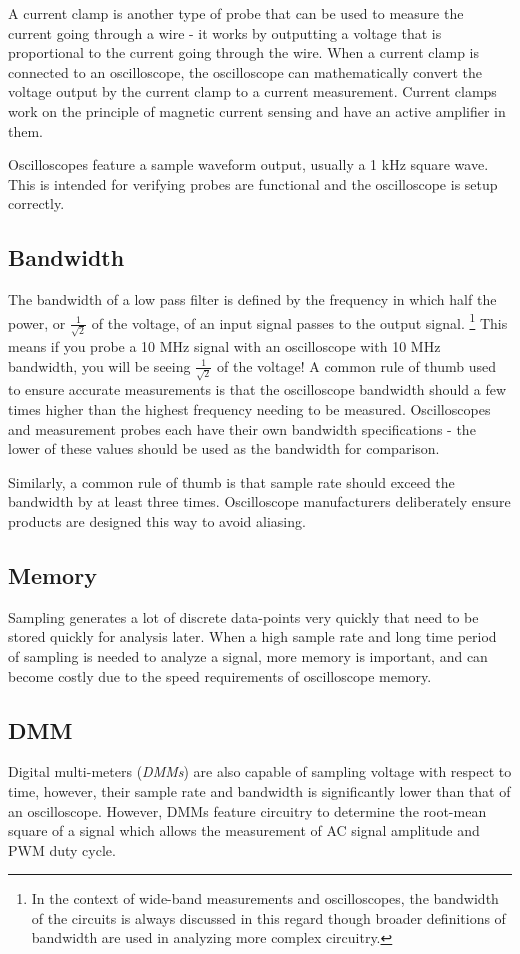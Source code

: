 \documentclass[main.tex]{subfiles}
\begin{document}
\newnoindentpara A current clamp is another type of probe that can be used to measure the current going through a wire - it works by outputting a voltage that is proportional to the current going through the wire. When a current clamp is connected to an oscilloscope, the oscilloscope can mathematically convert the voltage output by the current clamp to a current measurement. Current clamps work on the principle of magnetic current sensing and have an active amplifier in them.

Oscilloscopes feature a sample waveform output, usually a 1 kHz square wave. This is intended for verifying probes are functional and the oscilloscope is setup correctly. %

\subsection{Bandwidth}
The bandwidth of a low pass filter is defined by the frequency in which half the power, or $\frac{1}{\sqrt{2}}$ of the voltage, of an input signal passes to the output signal. \footnote{In the context of wide-band measurements and oscilloscopes, the bandwidth of the circuits is always discussed in this regard though broader definitions of bandwidth are used in analyzing more complex circuitry.}
This means if you probe a 10 MHz signal with an oscilloscope with 10 MHz bandwidth, you will be seeing $\frac{1}{\sqrt{2}}$ of the voltage! A common rule of thumb used to ensure accurate measurements is that the oscilloscope bandwidth should a few times higher than the highest frequency needing to be measured. Oscilloscopes and measurement probes each have their own bandwidth specifications - the lower of these values should be used as the bandwidth for comparison. \newline

\newnoindentpara Similarly, a common rule of thumb is that sample rate should exceed the bandwidth by at least three times. Oscilloscope manufacturers deliberately ensure products are designed this way to avoid aliasing. 

\subsection{Memory}
Sampling generates a lot of discrete data-points very quickly that need to be stored quickly for analysis later. When a high sample rate and long time period of sampling is needed to analyze a signal, more memory is important, and can become costly due to the speed requirements of oscilloscope memory.
\subsection{DMM}
Digital multi-meters (\textit{DMMs}) are also capable of sampling voltage with respect to time, however, their sample rate and bandwidth is significantly lower than that of an oscilloscope. However, DMMs feature circuitry to determine the root-mean square of a signal which allows the measurement of AC signal amplitude and PWM duty cycle.
\end{document}
